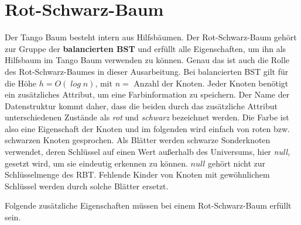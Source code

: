 \documentclass[a4paper,12pt]{article}
\begin{document}
\section{Rot-Schwarz-Baum}
Der Tango Baum besteht intern aus Hilfsbäumen. Der Rot-Schwarz-Baum gehört zur Gruppe der \textbf{balancierten BST} und erfüllt alle Eigenschaften, um ihn als Hilfsbaum im Tango Baum verwenden zu können. Genau das ist auch die Rolle des Rot-Schwarz-Baumes in dieser Ausarbeitung. Bei balancierten BST gilt für die Höhe $h = \mathit{O(\log n)}$, mit $n =$ Anzahl der Knoten. Jeder Knoten benötigt ein zusätzliches Attribut, um eine Farbinformation zu speichern. Der Name der Datenstruktur kommt daher, dass die beiden durch das zusätzliche Attribut unterschiedenen Zustände als \textit{rot} und \textit{schwarz} bezeichnet werden. Die Farbe ist also eine Eigenschaft der Knoten und im folgenden wird einfach von roten bzw. schwarzen Knoten gesprochen. Als Blätter werden schwarze Sonderknoten verwendet, deren Schlüssel auf einen Wert außerhalb des Universums, hier \textit{null}, gesetzt wird, um sie eindeutig erkennen zu können. $\mathit{null}$ gehört nicht zur Schlüsselmenge des RBT. Fehlende Kinder von Knoten mit gewöhnlichem Schlüssel werden durch solche Blätter ersetzt.  

\noindent Folgende zusätzliche Eigenschaften müssen bei einem Rot-Schwarz-Baum erfüllt sein. 
\end{document}
